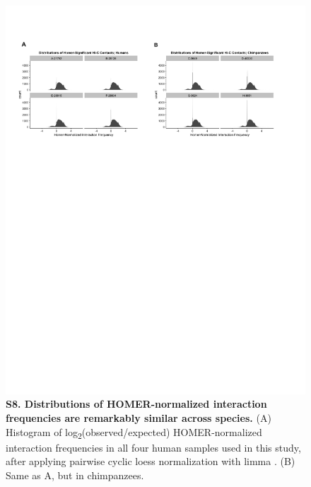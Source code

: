 \begin{figure}[!htb]
\centering
\includegraphics[width=6in]{img/figS8.pdf}
\caption[Distributions of HOMER-normalized interaction frequencies are remarkably similar across species.]{\textbf{S8. Distributions of HOMER-normalized interaction frequencies are remarkably similar across species.} (A) Histogram of log\textsubscript{2}(observed/expected) HOMER-normalized interaction frequencies in all four human samples used in this study, after applying pairwise cyclic loess normalization with limma \cite{Smyth.2004}. (B) Same as A, but in chimpanzees.}
\label{fig:ch02-figS8}
\end{figure}

